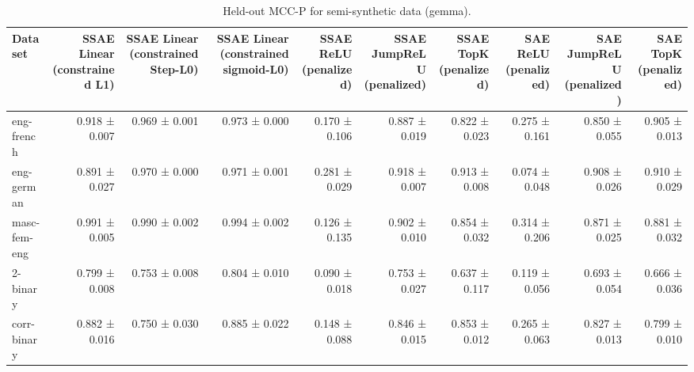 \begin{table}[t]
\centering
\caption{Held-out MCC-P for semi-synthetic data (gemma).}
\label{tab:semisynthetic-gemma-mcc-p}
\begin{tabular}{lrrrrrrrrr}
\toprule
Dataset & SSAE Linear (constrained L1) & SSAE Linear (constrained Step-L0) & SSAE Linear (constrained sigmoid-L0) & SSAE ReLU (penalized) & SSAE JumpReLU (penalized) & SSAE TopK (penalized) & SAE ReLU (penalized) & SAE JumpReLU (penalized) & SAE TopK (penalized) \\
\midrule
eng-french & 0.918 ± 0.007 & 0.969 ± 0.001 & 0.973 ± 0.000 & 0.170 ± 0.106 & 0.887 ± 0.019 & 0.822 ± 0.023 & 0.275 ± 0.161 & 0.850 ± 0.055 & 0.905 ± 0.013 \\
eng-german & 0.891 ± 0.027 & 0.970 ± 0.000 & 0.971 ± 0.001 & 0.281 ± 0.029 & 0.918 ± 0.007 & 0.913 ± 0.008 & 0.074 ± 0.048 & 0.908 ± 0.026 & 0.910 ± 0.029 \\
masc-fem-eng & 0.991 ± 0.005 & 0.990 ± 0.002 & 0.994 ± 0.002 & 0.126 ± 0.135 & 0.902 ± 0.010 & 0.854 ± 0.032 & 0.314 ± 0.206 & 0.871 ± 0.025 & 0.881 ± 0.032 \\
2-binary & 0.799 ± 0.008 & 0.753 ± 0.008 & 0.804 ± 0.010 & 0.090 ± 0.018 & 0.753 ± 0.027 & 0.637 ± 0.117 & 0.119 ± 0.056 & 0.693 ± 0.054 & 0.666 ± 0.036 \\
corr-binary & 0.882 ± 0.016 & 0.750 ± 0.030 & 0.885 ± 0.022 & 0.148 ± 0.088 & 0.846 ± 0.015 & 0.853 ± 0.012 & 0.265 ± 0.063 & 0.827 ± 0.013 & 0.799 ± 0.010 \\
\bottomrule
\end{tabular}
\end{table}
